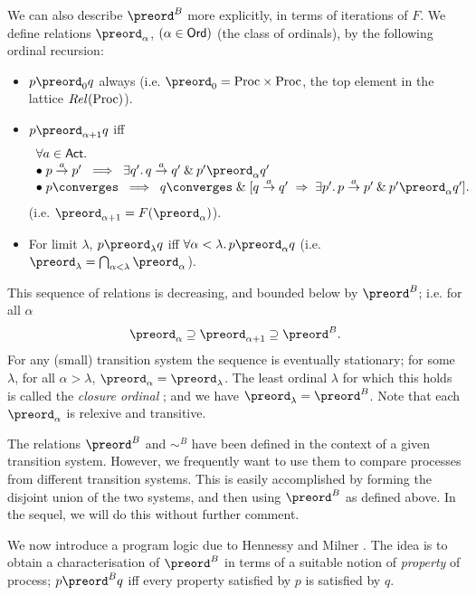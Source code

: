 We can also describe $\preord^{B}$ more explicitly, in terms of iterations of $F$. We define relations $\preord_{\alpha}$, $(\alpha \in {\sf Ord})$ (the class of ordinals), by the following ordinal recursion:
\begin{itemize}
\item $p \preord_{0} q$ always (i.e. $\preord_{0} = {\rm Proc} \times {\rm Proc}$, the top element in the lattice $Rel({\rm Proc})$).
\item $p \preord_{\alpha + 1} q$ iff
\[ \begin{array}{l}
\forall a \in {\sf Act} . \\
\bullet \; p \stackrel{a}{\rightarrow} p' \;\; \Longrightarrow \;\; \exists q' . \, q \stackrel{a}{\rightarrow} q' \: \& \: p' \preord_{\alpha} q' \\
\bullet \; p \converges \;\; \Longrightarrow \;\; q \converges \; \& \;  [q \stackrel{a}{\rightarrow} q' \; \Rightarrow \; \exists p' . \, p \stackrel{a}{\rightarrow} p' \: \& \: p' \preord_{\alpha} q' ]  .
\end{array} \]
(i.e. $\preord_{\alpha + 1} = F(\preord_{\alpha})$).

\item For limit $\lambda$, $p \preord_{\lambda} q$ iff $\forall \alpha < \lambda . \, p \preord_{\alpha} q$ (i.e. $\preord_{\lambda} = \bigcap_{\alpha < \lambda} \preord_{\alpha}$).
\end{itemize}

This sequence of relations is decreasing, and bounded below by $\preord^{B}$; i.e. for all $\alpha$
\[ {\preord_{\alpha}} \supseteq {\preord_{\alpha + 1}} \supseteq {\preord^{B}} . \]
For any (small) transition system the sequence is eventually stationary; for some $\lambda$, for all $\alpha > \lambda$, $\preord_{\alpha} = \preord_{\lambda}$.
The least ordinal $\lambda$ for which this holds is called the {\em closure ordinal} \cite{Mos74}; and we have ${\preord_{\lambda}} = {\preord^{B}}$.
Note that each $\preord_{\alpha}$ is relexive and transitive.

The relations $\preord^{B}$ and $\sim^{B}$ have been defined in the context of a given transition system. However, we frequently want to use them to compare processes from different transition systems.
This is easily accomplished by forming the disjoint union of the two systems, and then using $\preord^{B}$ as defined above. In the sequel, we will do this without further comment.

We now introduce a program logic due to Hennessy and Milner \cite{HM85}. The idea is to obtain a characterisation of $\preord^{B}$ in terms of a suitable notion of {\em property} of process; $p \preord^{B} q$ iff every property satisfied by $p$ is satisfied by $q$.

